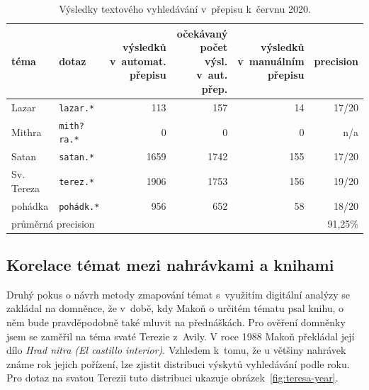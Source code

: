 \begin{table}[htpb]
\begin{center}
\begin{tabular}{|l|l|r|r|r|r|}
\hline
téma &
dotaz &
\makecell{výsledků\\ v~automat.\\ přepisu} &
\makecell{očekávaný\\ počet výsl.\\ v~aut. přep.} &
\makecell{výsledků\\ v~manuálním\\ přepisu} &
precision \\
\hline
Lazar & \texttt{lazar.*} & 113 & 157 & 14 & 17/20   \\
Mithra & \texttt{mith?ra.*} & 0 & 0 & 0 & n/a   \\
Satan & \texttt{satan.*} & 1659 & 1742 & 155 & 17/20   \\
Sv. Tereza & \texttt{terez.*} & 1906 & 1753 & 156 & 19/20   \\
pohádka & \texttt{pohádk.*} & 956 & 652 & 58 & 18/20   \\
\hline
\multicolumn{5}{|l|}{průměrná precision} & 91,25\%\\
\hline
\end{tabular}
\caption{Výsledky textového vyhledávání v~přepisu k~červnu 2020.}\label{tab:topicsearch2020}
\end{center}
\end{table}

\subsection{Korelace témat mezi nahrávkami a knihami}

Druhý pokus o návrh metody zmapování témat s~využitím digitální analýzy se zakládal na
domněnce, že v~době, kdy Makoň o určitém tématu psal knihu, o něm bude
pravděpodobně také mluvit na přednáškách. Pro ověření domněnky jsem se zaměřil
na téma svaté Terezie z~Avily. V roce 1988 Makoň překládal její dílo {\em Hrad nitra
(El castillo interior)}. Vzhledem k~tomu, že u většiny nahrávek známe rok jejich
pořízení, lze zjistit distribuci výskytů vyhledávání podle roku. Pro dotaz na
svatou Terezii tuto distribuci ukazuje obrázek~\ref{fig:teresa-year}.

